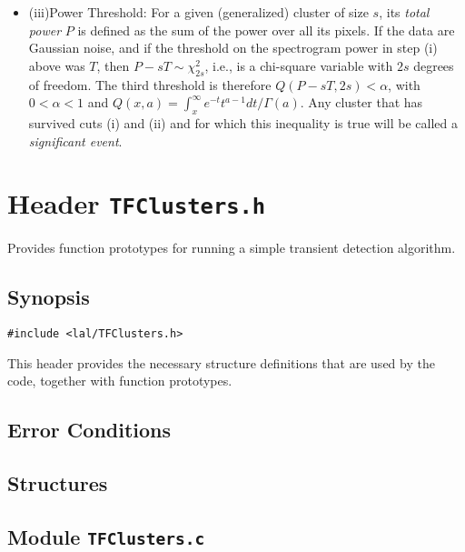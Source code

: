 \begin{itemize}
\item{(iii)Power Threshold:} For a given (generalized) cluster of size $s$, its {\it total power} $P$ is defined as the sum of the power over all its pixels. If the data are Gaussian noise, and if the threshold on the spectrogram power in step (i) above was $T$, then $P-sT \sim \chi^2_{2s}$, i.e., is a chi-square variable with $2s$ degrees of freedom. The third threshold is therefore $Q(P-sT,2s) < \alpha$, with $0<\alpha<1$ and $Q(x,a) = \int_x^\infty e^{-t}t^{a-1} dt / \Gamma(a)$. Any cluster that has survived cuts (i) and (ii) and for which this inequality is true will be called a {\it significant event}.
\end{itemize}

\newpage
\section{Header \texttt{TFClusters.h}}
\label{s:TFClusters.h}

\noindent Provides function prototypes for running a simple transient detection algorithm.

\subsection*{Synopsis}
\begin{verbatim}
#include <lal/TFClusters.h>
\end{verbatim}

\noindent This header provides the necessary structure definitions that are used by the code, together with function prototypes.

\subsection*{Error Conditions}


\newpage
\subsection*{Structures}


\newpage
\subsection{Module \texttt{TFClusters.c}}
\label{ss:TFClusters.c} 



